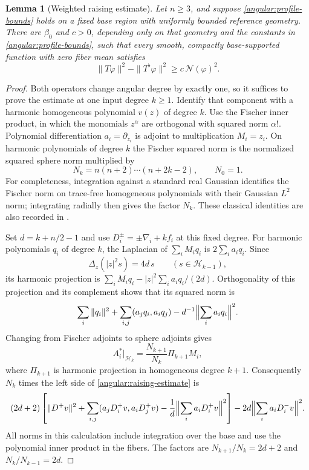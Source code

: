 \documentclass[11pt]{article}
\newtheorem{lemma}[theorem]{Lemma}
\theoremstyle{definition}
\theoremstyle{remark}
\numberwithin{equation}{section}
\begin{document}
\begin{lemma}[Weighted raising estimate]\label{angular:raising}
Let $n\ge3$, and suppose \eqref{angular:profile-bounds} holds on a fixed
base region with uniformly bounded reference geometry.  There are
$\beta_0$ and $c>0$, depending only on that geometry and the constants in
\eqref{angular:profile-bounds}, such that every smooth, compactly
base-supported function with zero fiber mean satisfies
\begin{equation}\label{angular:raising-estimate}
 \|T\varphi\|^2-\|T^\flat\varphi\|^2
       \ge c\,\mathcal N(\varphi)^2.
\end{equation}
\end{lemma}

\begin{proof}
Both operators change angular degree by exactly one, so it suffices to
prove the estimate at one input degree $k\ge1$.  Identify that component
with a harmonic homogeneous polynomial $v(z)$ of degree $k$.  Use the
Fischer inner product, in which the monomials $z^\alpha$ are orthogonal
with squared norm $\alpha!$.  Polynomial differentiation $a_i=\partial_{z_i}$
is adjoint to multiplication $M_i=z_i$.  On harmonic polynomials of degree
$k$ the Fischer squared norm is the normalized squared sphere norm
multiplied by
\[
 N_k=n(n+2)\cdots(n+2k-2),\qquad N_0=1.
\]
For completeness, integration against a standard real Gaussian identifies
the Fischer norm on trace-free homogeneous polynomials with their
Gaussian $L^2$ norm;
integrating radially then gives the factor $N_k$.  These classical
identities are also recorded in \cite[Equation~(2.1) and
Theorem~2.1]{Render08}.

Set $d=k+n/2-1$ and use $D_i^\pm=\pm\nabla_i+k f_i$ at this fixed degree.
For harmonic polynomials $q_i$ of degree $k$, the Laplacian of
$\sum_iM_iq_i$ is $2\sum_i a_iq_i$.  Since
\[
 \Delta_z(|z|^2s)=4d\,s\qquad(s\in\mathcal H_{k-1}),
\]
its harmonic projection is
$\sum_iM_iq_i-|z|^2\sum_i a_iq_i/(2d)$.  Orthogonality of this projection
and its complement shows that its squared norm is
\[
 \sum_i\|q_i\|^2+\sum_{i,j}(a_jq_i,a_iq_j)
             -d^{-1}\Bigl\|\sum_i a_iq_i\Bigr\|^2.
\]
Changing from Fischer adjoints to sphere adjoints gives
\[
 A_i^*|_{\mathcal H_k}
   =\frac{N_{k+1}}{N_k}\Pi_{k+1}M_i,
\]
where $\Pi_{k+1}$ is harmonic projection in homogeneous degree $k+1$.
Consequently $N_k$ times the left side of
\eqref{angular:raising-estimate} is
\begin{equation}\label{angular:Fock-difference}
 \begin{split}
 (2d+2)\left[\|D^+v\|^2
   +\sum_{i,j}(a_jD_i^+v,a_iD_j^+v)
   -\frac1d\Bigl\|\sum_i a_iD_i^+v\Bigr\|^2\right]
 -2d\Bigl\|\sum_i a_iD_i^-v\Bigr\|^2.
 \end{split}
\end{equation}
All norms in this calculation include integration over the base and use
the polynomial inner product in the fibers.  The factors are
$N_{k+1}/N_k=2d+2$ and $N_k/N_{k-1}=2d$.


\end{proof}
\end{document}
